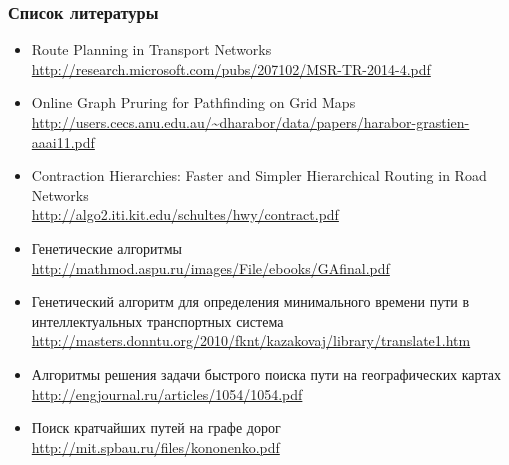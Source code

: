 \begin{frame} %
    \frametitle{Список литературы}
    \begin{itemize}
        \item Route Planning in Transport Networks\\
            \tiny\url{http://research.microsoft.com/pubs/207102/MSR-TR-2014-4.pdf}
        \item\normalsize Online Graph Pruring for Pathfinding on Grid Maps
            \tiny\url{http://users.cecs.anu.edu.au/~dharabor/data/papers/harabor-grastien-aaai11.pdf}
        \item\normalsize Contraction Hierarchies: Faster and Simpler Hierarchical 
            Routing in Road Networks\\
            \tiny\url{http://algo2.iti.kit.edu/schultes/hwy/contract.pdf}
        \item\normalsize Генетические алгоритмы\\
            \tiny\url{http://mathmod.aspu.ru/images/File/ebooks/GAfinal.pdf}
        \item\normalsize Генетический алгоритм для определения минимального времени пути в 
            интеллектуальных транспортных система\\
            \tiny\url{http://masters.donntu.org/2010/fknt/kazakovaj/library/translate1.htm}
        \item\normalsize Алгоритмы решения задачи быстрого поиска пути на географических картах\\
            \tiny\url{http://engjournal.ru/articles/1054/1054.pdf}
        \item\normalsize Поиск кратчайших путей на графе дорог\\
            \tiny\url{http://mit.spbau.ru/files/kononenko.pdf}
    \end{itemize}
\end{frame}

